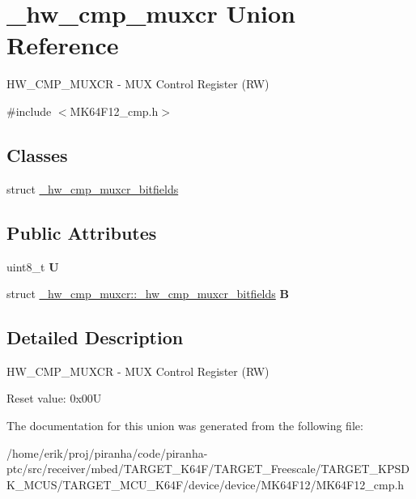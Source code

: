 \hypertarget{union__hw__cmp__muxcr}{}\section{\+\_\+hw\+\_\+cmp\+\_\+muxcr Union Reference}
\label{union__hw__cmp__muxcr}


H\+W\+\_\+\+C\+M\+P\+\_\+\+M\+U\+X\+CR -\/ M\+UX Control Register (RW)  




{\ttfamily \#include $<$M\+K64\+F12\+\_\+cmp.\+h$>$}

\subsection*{Classes}
\begin{DoxyCompactItemize}
\item 
struct \hyperlink{struct__hw__cmp__muxcr_1_1__hw__cmp__muxcr__bitfields}{\+\_\+hw\+\_\+cmp\+\_\+muxcr\+\_\+bitfields}
\end{DoxyCompactItemize}
\subsection*{Public Attributes}
\begin{DoxyCompactItemize}
\item 
uint8\+\_\+t {\bfseries U}\hypertarget{union__hw__cmp__muxcr_a90f0c368b49a25fe45ee91b3710c834e}{}\label{union__hw__cmp__muxcr_a90f0c368b49a25fe45ee91b3710c834e}

\item 
struct \hyperlink{struct__hw__cmp__muxcr_1_1__hw__cmp__muxcr__bitfields}{\+\_\+hw\+\_\+cmp\+\_\+muxcr\+::\+\_\+hw\+\_\+cmp\+\_\+muxcr\+\_\+bitfields} {\bfseries B}\hypertarget{union__hw__cmp__muxcr_abc5d08a6acc838b6db843191a4762865}{}\label{union__hw__cmp__muxcr_abc5d08a6acc838b6db843191a4762865}

\end{DoxyCompactItemize}


\subsection{Detailed Description}
H\+W\+\_\+\+C\+M\+P\+\_\+\+M\+U\+X\+CR -\/ M\+UX Control Register (RW) 

Reset value\+: 0x00U 

The documentation for this union was generated from the following file\+:\begin{DoxyCompactItemize}
\item 
/home/erik/proj/piranha/code/piranha-\/ptc/src/receiver/mbed/\+T\+A\+R\+G\+E\+T\+\_\+\+K64\+F/\+T\+A\+R\+G\+E\+T\+\_\+\+Freescale/\+T\+A\+R\+G\+E\+T\+\_\+\+K\+P\+S\+D\+K\+\_\+\+M\+C\+U\+S/\+T\+A\+R\+G\+E\+T\+\_\+\+M\+C\+U\+\_\+\+K64\+F/device/device/\+M\+K64\+F12/M\+K64\+F12\+\_\+cmp.\+h\end{DoxyCompactItemize}
